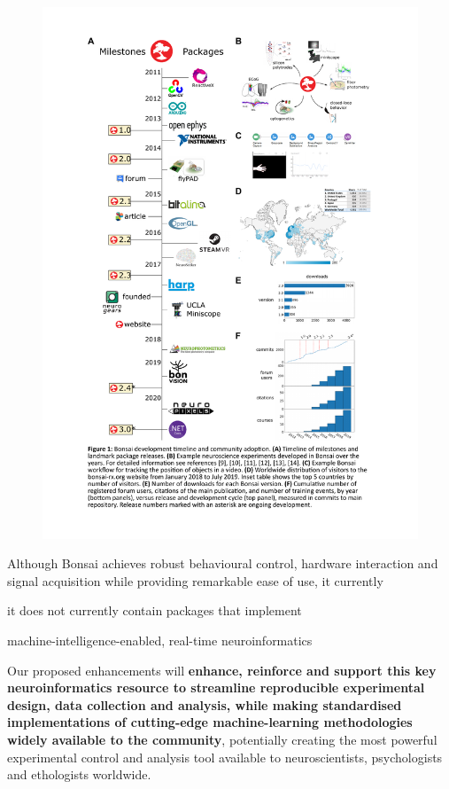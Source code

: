 \setlength{\columnsep}{1em}
\begin{figure}
  \includegraphics[width=0.5\columnwidth,viewport=65 50 500 800,clip]{figures/bonsai.pdf}
  \label{fig:bonsai}
\end{figure}



Although Bonsai achieves robust behavioural control, hardware interaction and signal acquisition while providing remarkable ease of use, it currently 

it does not currently contain packages that implement 

machine-intelligence-enabled, real-time neuroinformatics


Our proposed enhancements will \textbf{enhance, reinforce and support this key neuroinformatics
  resource to streamline reproducible experimental design, data collection and analysis, while making standardised implementations of cutting-edge machine-learning methodologies widely available to the community}, potentially creating the most powerful experimental
control and analysis tool available to neuroscientists, psychologists and
ethologists worldwide.




%

%




%



